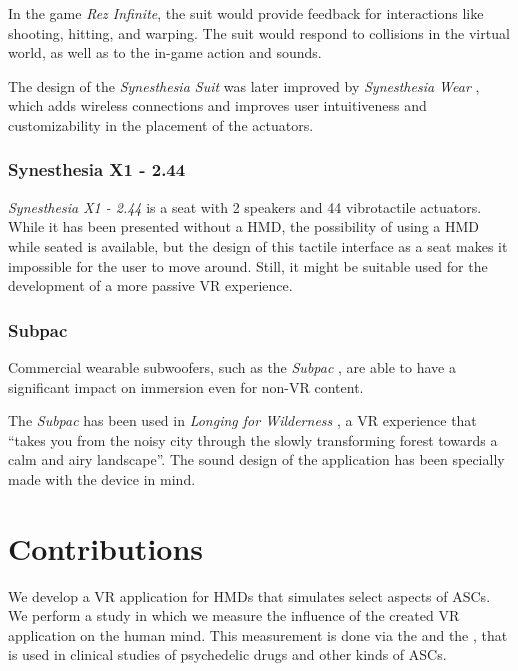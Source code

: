 In the game \textit{Rez Infinite}, the suit would provide feedback for interactions like shooting, hitting, and warping. The suit would respond to collisions in the virtual world, as well as to the in-game action and sounds.

The design of the \textit{Synesthesia Suit} was later improved by \textit{Synesthesia Wear} \autocite{furukawa2019synesthesia}, which adds wireless connections and improves user intuitiveness and customizability in the placement of the actuators.

\subsubsection{Synesthesia X1 - 2.44}
\textit{Synesthesia X1 - 2.44} \autocite{synesthesia2021x1} is a seat with 2 speakers and 44 vibrotactile actuators. While it has been presented without a \ac{HMD}, the possibility of using a \ac{HMD} while seated is available, but the design of this tactile interface as a seat makes it impossible for the user to move around. Still, it might be suitable used for the development of a more passive \ac{VR} experience.

\subsubsection{Subpac}
Commercial wearable subwoofers, such as the \textit{Subpac} \autocite{subpac2013subpac}, are able to have a significant impact on immersion \autocite{drempetic2017wearable} even for non-\ac{VR} content.

The \textit{Subpac} has been used in \textit{Longing for Wilderness} \autocite{zimmermann2016longing}, a \ac{VR} experience that ``takes you from the noisy city through the slowly transforming forest towards a calm and airy landscape''. The sound design of the application has been specially made with the device in mind.

\section{Contributions}
We develop a \ac{VR} application for \acp{HMD} that simulates select aspects of \acp{ASC}.
We perform a study in which we measure the influence of the created \ac{VR} application on the human mind. This measurement is done via the  and the , that is used in clinical studies of psychedelic drugs and other kinds of \acp{ASC}.
